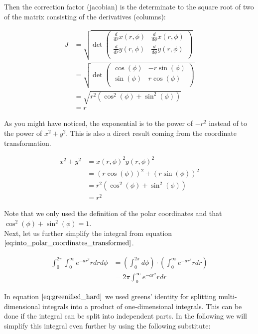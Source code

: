 \documentclass{paper}
\begin{document}
Then the correction factor (jacobian) is the determinate to the square root of two of the matrix consisting of the derivatives (columns):

\begin{align}
J
&=
\sqrt{\det
\begin{pmatrix}
\frac{d}{dr} x(r,\phi) & \frac{d}{d\phi} x(r,\phi) \\
\frac{d}{dr} y(r,\phi) & \frac{d}{d\phi} y(r,\phi) \\
\end{pmatrix}} \\
&= 
\sqrt{\det
\begin{pmatrix}
\cos(\phi) & -r \sin(\phi) \\
\sin(\phi) & r \cos(\phi) \\
\end{pmatrix}} \\
&= \sqrt{r^2(\cos^2(\phi) + \sin^2(\phi))} \\
&= r
\label{eq:jacobian}
\end{align}

As you might have noticed, the exponential is to the power of $-r^2$ instead of to the power of $x^2 + y^2$. This is also a direct result coming from the coordinate transformation.

\begin{align}
    x^2 + y^2 
    &= x(r, \phi)^2 y(r, \phi)^2 \\
    &= (r\cos(\phi))^2+(r \sin(\phi))^2 \\
    &= r^2 (\cos^2(\phi) + \sin^2(\phi)) \\
    &= r^2
\end{align}

Note that we only used the definition of the polar coordinates and that $\cos^2(\phi) + \sin^2(\phi) = 1$. \\

Next, let us further simplify the integral from equation $\ref{eq:into_polar_coordinates_transformed}$.

\begin{align}
    \int_{0}^{2 \pi} \int_{0}^{\infty} e^{-ar^2} r dr d\phi
    &= (\int_{0}^{2 \pi} d\phi)\cdot (\int_{0}^{\infty} e^{-ar^2} r dr) \\
    &= 2\pi \int_{0}^{\infty} e^{-ar^2} r dr
\label{eq:greenified_hard}
\end{align}

In equation $\ref{eq:greenified_hard}$ we used greens' identity for splitting multi-dimensional integrals into a product of one-dimensional integrals. This can be done if the integral can be split into independent parts. In the following we will simplify this integral even further by using the following substitute:
\end{document}
